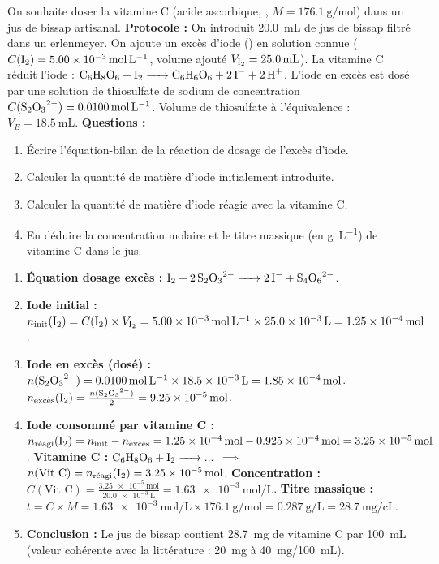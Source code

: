 \documentclass[11pt]{article}
\begin{document}
\begin{exercice}
On souhaite doser la vitamine C (acide ascorbique, , $M = \SI{176,1}{\gram\per\mol}$) dans un jus de bissap artisanal.
\textbf{Protocole :} On introduit \SI{20,0}{\milli\liter} de jus de bissap filtré dans un erlenmeyer. On ajoute un excès d'iode () en solution connue ($C(\ce{I2}) = \SI{5,00e-3}{\mole\per\liter}$, volume ajouté $V_{\ce{I2}} = \SI{25,0}{\milli\liter}$). La vitamine C réduit l'iode : $\ce{C6H8O6 + I2 -> C6H6O6 + 2I- + 2H+}$.
L'iode en excès est dosé par une solution de thiosulfate de sodium  de concentration $C(\ce{S2O3^{2-}}) = \SI{0,0100}{\mole\per\liter}$.
Volume de thiosulfate à l'équivalence : $V_E = \SI{18,5}{\milli\liter}$.
\textbf{Questions :}
\begin{enumerate}
  \item Écrire l'équation-bilan de la réaction de dosage de l'excès d'iode.
  \item Calculer la quantité de matière d'iode initialement introduite.
  \item Calculer la quantité de matière d'iode réagie avec la vitamine C.
  \item En déduire la concentration molaire et le titre massique (en \si{\gram\per\liter}) de vitamine C dans le jus.
\end{enumerate}
\end{exercice}

\begin{corrige}
\begin{enumerate}
  \item \textbf{Équation dosage excès :} $\ce{I2 + 2S2O3^{2-} -> 2I- + S4O6^{2-}}$.
  \item \textbf{Iode initial :} $n_{\text{init}}(\ce{I2}) = C(\ce{I2}) \times V_{\ce{I2}} = \SI{5,00e-3}{\mole\per\liter} \times \SI{25,0e-3}{\liter} = \SI{1,25e-4}{\mol}$.
  \item \textbf{Iode en excès (dosé) :}
  $n(\ce{S2O3^{2-}}) = \SI{0,0100}{\mole\per\liter} \times \SI{18,5e-3}{\liter} = \SI{1,85e-4}{\mol}$.
  $n_{\text{excès}}(\ce{I2}) = \frac{n(\ce{S2O3^{2-}})}{2} = \SI{9,25e-5}{\mol}$.
  \item \textbf{Iode consommé par vitamine C :}
  $n_{\text{réagi}}(\ce{I2}) = n_{\text{init}} - n_{\text{excès}} = \SI{1,25e-4}{\mol} - \SI{0,925e-4}{\mol} = \SI{3,25e-5}{\mol}$.
  \textbf{Vitamine C :} $\ce{C6H8O6 + I2 -> ...}$ $\implies$ $n(\text{Vit C}) = n_{\text{réagi}}(\ce{I2}) = \SI{3,25e-5}{\mol}$.
  \textbf{Concentration :} $C(\text{Vit C}) = \frac{\SI{3,25e-5}{\mol}}{\SI{20,0e-3}{\liter}} = \SI{1,63e-3}{\mole\per\liter}$.
  \textbf{Titre massique :} $t = C \times M = \SI{1,63e-3}{\mole\per\liter} \times \SI{176,1}{\gram\per\mol} = \SI{0,287}{\gram\per\liter} = \SI{28,7}{\milli\gram\per\centi\liter}$.
  \item \textbf{Conclusion :} Le jus de bissap contient \SI{28,7}{\milli\gram} de vitamine C par \SI{100}{\milli\liter} (valeur cohérente avec la littérature : \SI{20}{\milli\gram} à \SI{40}{\milli\gram}/\SI{100}{\milli\liter}).
\end{enumerate}
\end{corrige}
\end{document}
